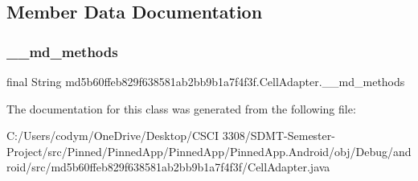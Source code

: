 \subsection{Member Data Documentation}
\mbox{\label{classmd5b60ffeb829f638581ab2bb9b1a7f4f3f_1_1_cell_adapter_abe33e45a7b887b1383f9c0ebda43ef00}} 
\subsubsection{\texorpdfstring{\+\_\+\+\_\+md\+\_\+methods}{\_\_md\_methods}}
{\footnotesize\ttfamily final String md5b60ffeb829f638581ab2bb9b1a7f4f3f.\+Cell\+Adapter.\+\_\+\+\_\+md\+\_\+methods\hspace{0.3cm}{\ttfamily [static]}}



The documentation for this class was generated from the following file\+:\begin{DoxyCompactItemize}
\item 
C\+:/\+Users/codym/\+One\+Drive/\+Desktop/\+C\+S\+C\+I 3308/\+S\+D\+M\+T-\/\+Semester-\/\+Project/src/\+Pinned/\+Pinned\+App/\+Pinned\+App/\+Pinned\+App.\+Android/obj/\+Debug/android/src/md5b60ffeb829f638581ab2bb9b1a7f4f3f/Cell\+Adapter.\+java\end{DoxyCompactItemize}
